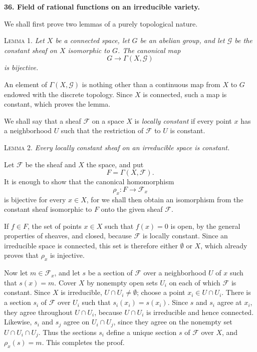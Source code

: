
\medskip
{}\label{fac:II:1:no:36}
\textbf{36. Field of rational functions on an irreducible variety.}

We shall first prove two lemmas of a purely topological nature.

\label{fac:II:1:no:36:lemma:1}
\textsc{Lemma 1.} \textit{Let $X$ be a connected space, let $G$ be an abelian group, and let $\mathcal{G}$ be the constant sheaf on $X$ isomorphic to $G$. The canonical map
\[
G\longrightarrow\Gamma(X,\mathcal{G})
\]
is bijective.}

An element of $\Gamma(X,\mathcal{G})$ is nothing other than a continuous map from $X$ to $G$ endowed with the discrete topology. Since $X$ is connected, such a map is constant, which proves the lemma.

We shall say that a sheaf $\mathcal{F}$ on a space $X$ is \textit{locally constant} if every point $x$ has a neighborhood $U$ such that the restriction of $\mathcal{F}$ to $U$ is constant.

\label{fac:II:1:no:36:lemma:2}
\textsc{Lemma 2.} \textit{Every locally constant sheaf on an irreducible space is constant.}

Let $\mathcal{F}$ be the sheaf and $X$ the space, and put
\[
F=\Gamma(X,\mathcal{F}).
\]
It is enough to show that the canonical homomorphism
\[
\rho_x:F\longrightarrow\mathcal{F}_x
\]
is bijective for every $x\in X$, for we shall then obtain an isomorphism from the constant sheaf isomorphic to $F$ onto the given sheaf $\mathcal{F}$.

If $f\in F$, the set of points $x\in X$ such that $f(x)=0$ is open, by the general properties of sheaves, and closed, because $\mathcal{F}$ is locally constant. Since an irreducible space is connected, this set is therefore either $\emptyset$ or $X$, which already proves that $\rho_x$ is injective.

Now let $m\in\mathcal{F}_x$, and let $s$ be a section of $\mathcal{F}$ over a neighborhood $U$ of $x$ such that $s(x)=m$. Cover $X$ by nonempty open sets $U_i$ on each of which $\mathcal{F}$ is constant. Since $X$ is irreducible, $U\cap U_i\neq\emptyset$; choose a point $x_i\in U\cap U_i$. There is a section $s_i$ of $\mathcal{F}$ over $U_i$ such that $s_i(x_i)=s(x_i)$. Since $s$ and $s_i$ agree at $x_i$, they agree throughout $U\cap U_i$, because $U\cap U_i$ is irreducible and hence connected. Likewise, $s_i$ and $s_j$ agree on $U_i\cap U_j$, since they agree on the nonempty set $U\cap U_i\cap U_j$. Thus the sections $s_i$ define a unique section $s$ of $\mathcal{F}$ over $X$, and $\rho_x(s)=m$. This completes the proof.

